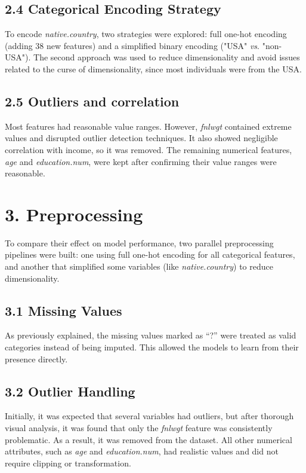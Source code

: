 \documentclass[a4paper,oneside,bibliography=totoc]{scrbook}
\begin{document}
\subsection*{2.4 Categorical Encoding Strategy}

To encode \textit{native.country}, two strategies were explored: full one-hot encoding (adding 38 new features) and a simplified binary encoding ("USA" \textit{vs}. "non-USA"). The second approach was used to reduce dimensionality and avoid issues related to the curse of dimensionality, since most individuals were from the USA. 


\subsection*{2.5 Outliers and correlation}

Most features had reasonable value ranges. However, \textit{fnlwgt} contained extreme values and disrupted outlier detection techniques. It also showed negligible correlation with income, so it was removed.
The remaining numerical features, \textit{age} and \textit{education.num}, were kept after confirming their value ranges were reasonable.



\section*{3. Preprocessing}

To compare their effect on model performance, two parallel preprocessing pipelines were built: one using full one-hot encoding for all categorical features, and another that simplified some variables (like \textit{native.country}) to reduce dimensionality.

\subsection*{3.1 Missing Values}

As previously explained, the missing values marked as “?” were treated as valid categories instead of being imputed. This allowed the models to learn from their presence directly. 


\subsection*{3.2 Outlier Handling}

Initially, it was expected that several variables had outliers, but after thorough visual analysis, it was found that only the \textit{fnlwgt} feature was consistently problematic. As a result, it was removed from the dataset. All other numerical attributes, such as \textit{age} and \textit{education.num}, had realistic values and did not require clipping or transformation.
\end{document}
